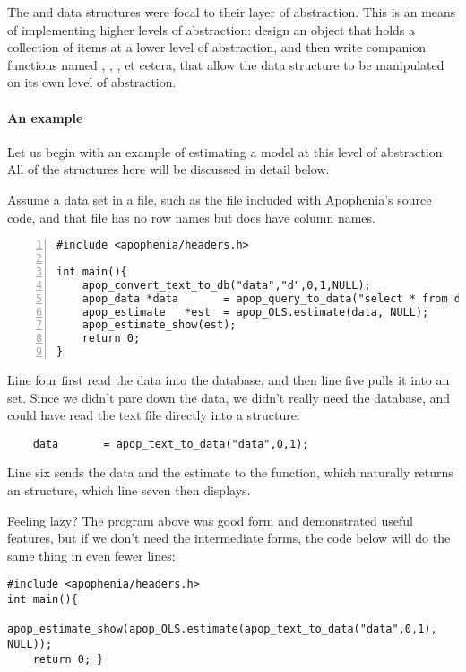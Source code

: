 The  and  data structures were focal to
their layer of abstraction. This is an 
means of implementing higher levels of abstraction: design an object that
holds a collection of items at a lower level of abstraction, and then
write companion functions named , ,
, et cetera, that allow the data structure to be
manipulated on its own level of abstraction.

\paragraph{An example}
Let us begin with an example of estimating a model at this level of
abstraction. All of the structures here will be discussed in detail
below.

Assume a
data set in a file, such as the  file included with
Apophenia's source code, and that file has no row names but does have
column names.
\begin{lstlisting}[numbers=left, numberstyle=\scshape]
#include <apophenia/headers.h>

int main(){
    apop_convert_text_to_db("data","d",0,1,NULL);
    apop_data *data       = apop_query_to_data("select * from d");
    apop_estimate   *est  = apop_OLS.estimate(data, NULL);
    apop_estimate_show(est);
    return 0;
}
\end{lstlisting}

Line four first read the data into the database, and then line five pulls
it into an  set. 
Since we didn't pare down the data,
we didn't really need the database, and could have read the text file
directly into a  structure:
\begin{lstlisting}
    data       = apop_text_to_data("data",0,1);
\end{lstlisting}
Line six 
sends the data and the estimate to the 
function, which naturally returns an 
structure, which line seven then displays.

Feeling lazy? The program above was good form and demonstrated useful
features, but if we don't need the intermediate forms, the code below
will do the same thing in even fewer lines:

\label{oneliner}
\begin{lstlisting}
#include <apophenia/headers.h>
int main(){
    apop_estimate_show(apop_OLS.estimate(apop_text_to_data("data",0,1), NULL));
    return 0; }
\end{lstlisting}


